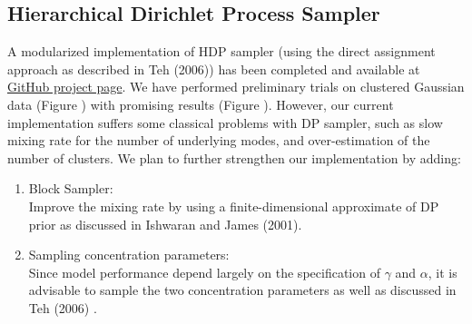 \documentclass[12pt]{article}
\begin{document}
\subsection{\textbf{Hierarchical Dirichlet Process Sampler}}
A modularized implementation of HDP sampler (using the direct assignment approach as described in Teh (2006)\citep{teh_hierarchical_2006}) has been completed and available at \href{https://github.com/willtownes/mit6882/tree/jere/jere/func}{GitHub project page}. We have performed preliminary trials on clustered Gaussian data (Figure ) with promising results (Figure ). However, our current implementation suffers some classical problems with DP sampler, such as slow mixing rate for the number of underlying modes, and over-estimation of the number of clusters. We plan to further strengthen our implementation by adding:
\begin{enumerate}
\item Block Sampler: \\
Improve the mixing rate by using a finite-dimensional approximate of DP prior as discussed in Ishwaran and James (2001). \citep{ishwaran_gibbs_2001}
\item Sampling concentration parameters: \\
Since model performance depend largely on the specification of $\gamma$ and $\alpha$, it is advisable to sample the two concentration parameters as well as discussed in Teh (2006) \citep{teh_hierarchical_2006}.
\end{enumerate} 
\end{document}
